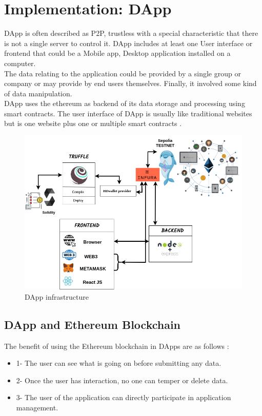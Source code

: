 \chapter{Implementation: DApp}
DApp is often described as P2P, trustless with a special characteristic that there is not a single server to control it. DApp includes at least one User interface or frontend that could be a Mobile app, Desktop application installed on a computer.\\
The data relating to the application could be provided by a single group or company or may provide by end users themselves. Finally, it involved some kind of data manipulation. \\
DApp uses the ethereum as backend of its data storage and processing using smart contracts. The user interface of DApp is usually like traditional websites but is one website plus one or multiple smart contracts \cite{William}.

\begin{center}
	
	\begin{figure}[htb!]
		
		\begin{minipage}{0.75\linewidth}
			
			\includegraphics[width=1.45\textwidth]{images/chap03_dapp.png}
		\end{minipage}
		\caption{DApp infrastructure}
		
	\end{figure}
	
\end{center}

\section{DApp and Ethereum Blockchain}
The benefit of using the Ethereum blockchain in DApps are as follows \cite{William}:
 \begin{itemize}
     \item 1- The user can see what is going on before submitting any data.
     \item 2- Once the user has interaction, no one can temper or delete data.
     \item 3- The user of the application can directly participate in application management.
 \end{itemize}
